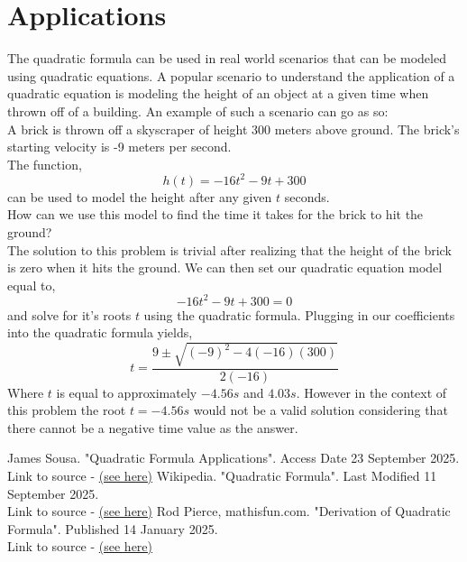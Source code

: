 \documentclass{article}
\theoremstyle{plain}
\theoremstyle{definition}
\begin{document}
\section{Applications}  \label{sect:application}
The quadratic formula can be used in real world scenarios that can be modeled using quadratic equations. A popular scenario to understand the application of a quadratic equation is modeling the height of an object at a given time when thrown off of a building.
An example of such a scenario can go as so:\\
A brick is thrown off a skyscraper of height 300 meters above ground. The brick's starting velocity is -9 meters per second.\\
The function,
$$h(t)=-16t^2-9t+300$$
can be used to model the height after any given $t$ seconds.\hfill\\
How can we use this model to find the time it takes for the brick to hit the ground?\hfill\\
The solution to this problem is trivial after realizing that the height of the brick is zero when it hits the ground. We can then set our quadratic equation model equal to,
$$-16t^2-9t+300=0$$
and solve for it's roots $t$ using the quadratic formula.
Plugging in our coefficients into the quadratic formula yields,
$$t=\frac{9\pm\sqrt{(-9)^2-4(-16)(300)}}{2(-16)}$$
Where $t$ is equal to approximately $-4.56 s$ and $4.03s$. However in the context of this problem the root $t=-4.56s$ would not be a valid solution considering that there cannot be a negative time value as the answer. 

\begin{thebibliography}{100}
        James Sousa. "Quadratic Formula Applications". Access Date 23 September 2025.\\Link to source - \href{https://courses.lumenlearning.com/cuny-hunter-collegealgebra/chapter/applications-of-quadratic-functions/}{(see here)}
        Wikipedia. "Quadratic Formula". Last Modified 11 September 2025.\\Link to source - 
       \href{https://en.wikipedia.org/wiki/Quadratic_formula}{(see here)}
        Rod Pierce, mathisfun.com. "Derivation of Quadratic Formula". Published 14 January 2025.\\Link to source - \href{https://www.mathsisfun.com/algebra/quadratic-equation-derivation.html}{(see here)}
\end{thebibliography}
\end{document}
